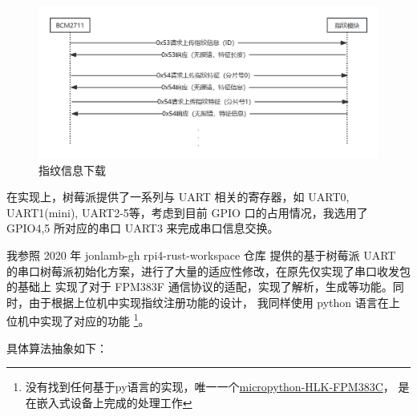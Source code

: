     \begin{figure}[H]
        \centering
        \includegraphics[scale=0.4]{./imgs/指纹信息下载.jpg}
        \caption{指纹信息下载}    \label{FPM383F::DownloadFingerPrintInfo}
    \end{figure}    

    在实现上，树莓派提供了一系列与 UART 相关的寄存器，如 UART0, UART1(mini), 
    UART2-5等，考虑到目前 GPIO 口的占用情况，我选用了 GPIO4,5 所对应的串口
    UART3 来完成串口信息交换。

    我参照 2020 年 jonlamb-gh rpi4-rust-workspace 仓库\cite{rpi4-rust-workspace}
    提供的基于树莓派 UART 的串口树莓派初始化方案，进行了大量的适应性修改，在原先仅实现了串口收发包的基础上
    实现了对于 FPM383F 通信协议的适配，实现了解析，生成等功能。同时，由于根据上位机中实现指纹注册功能的设计，
    我同样使用 python 语言在上位机中实现了对应的功能
    \footnote{没有找到任何基于py语言的实现，唯一一个\href{https://github.com/deerbleats/micropython-HLK-FPM383C}{micropython-HLK-FPM383C}， 是在嵌入式设备上完成的处理工作}。

    具体算法抽象如下：


